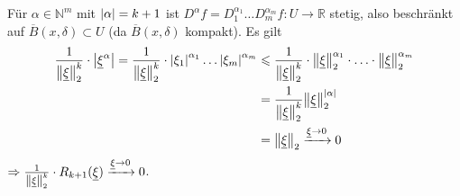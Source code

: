 Für $\alpha \in \mathds{N}^m$ mit $\abs*{\alpha} = k+1 $ ist $D^\alpha f =  D_1^{\alpha_1} \ldots  D_m^{\alpha_m} f : U \to \mathds{R}$ stetig, also beschränkt auf 
$\overline{B} (x, \delta) \subset U $ (da $\overline{B}(x, \delta ) $ kompakt). Es gilt
\begin{align*}
	\frac{1}{\norm[2]{\underline{\xi}}^k } \cdot \abs*{\underline{\xi}^\alpha} = \frac{1}{\norm[2]{\underline{\xi}}^k } \cdot \abs*{\xi_1}^{\alpha_1} \ldots \abs*{\xi_m}^{\alpha_m} &\le \frac{1}{\norm[2]{\underline{\xi}}^k } \cdot \norm[2]{\underline{\xi}}^{\alpha_1} \cdot \ldots \cdot \norm[2]{\underline{\xi}}^{\alpha_m}\\
	&= \frac{1}{\norm[2]{\underline{\xi}}^k } \norm[2]{\underline{\xi}}^{\abs*{\alpha} } \\
	&= \norm[2]{\underline{\xi}}  \xrightarrow{\underline{\xi} \to 0} 0
\end{align*}
$\Rightarrow \frac{1}{\norm[2]{\underline{\xi}}^k } \cdot R_{k+1} (\underline{\xi}) \xrightarrow{\underline{\xi} \to 0} 0 $. \bewende

